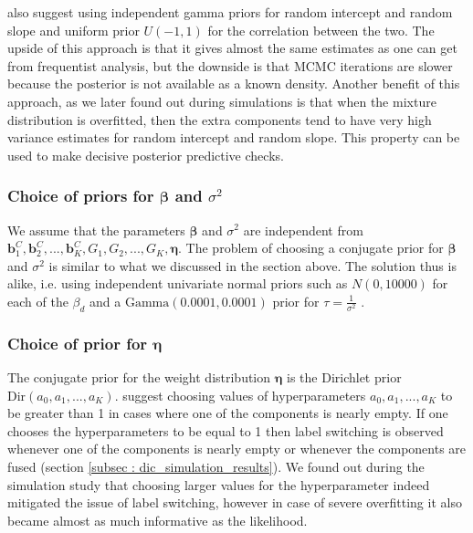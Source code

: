 \citet[pg. 260]{lesaffre_bayesian_2012} also suggest using independent gamma priors for random intercept and random slope and uniform prior $U(-1,1)$ for the correlation between the two. The upside of this approach is that it gives almost the same estimates as one can get from frequentist analysis, but the downside is that MCMC iterations are slower because the posterior is not available as a known density. Another benefit of this approach, as we later found out during simulations is that when the mixture distribution is overfitted, then the extra components tend to have very high variance estimates for random intercept and random slope. This property can be used to make decisive posterior predictive checks.

\subsubsection{Choice of priors for $\boldsymbol{\beta}$ and $\sigma^2$}
We assume that the parameters $\boldsymbol{\beta}$ and $\sigma^2$ are independent from $\boldsymbol{b}_1^C, \boldsymbol{b}_2^C, ..., \boldsymbol{b}_K^C, G_1, G_2, ..., G_K, \boldsymbol{\eta}$. The problem of choosing a conjugate prior for $\boldsymbol{\beta}$ and $\sigma^2$ is similar to what we discussed in the section above. The solution thus is alike, i.e. using independent univariate normal priors such as $N(0, 10000)$ for each of the $\beta_d$ and a $\text{Gamma}(0.0001, 0.0001)$ prior for $\tau = \frac 1 {\sigma^2}$ \citep[chap. 17]{gelman_data_2006}.

\subsubsection{Choice of prior for $\boldsymbol{\eta}$}
The conjugate prior for the weight distribution $\boldsymbol{\eta}$ is the Dirichlet prior $\text{Dir}(a_0, a_1,..., a_K)$. \citet[pg. 105]{fruhwirth-schnatter_finite_2013} suggest choosing values of hyperparameters $a_0, a_1,..., a_K$ to be greater than 1 in cases where one of the components is nearly empty. If one chooses the hyperparameters to be equal to 1 then label switching is observed whenever one of the components is nearly empty or whenever the components are fused (section \ref{subsec : dic_simulation_results}). We found out during the simulation study that choosing larger values for the hyperparameter indeed mitigated the issue of label switching, however in case of severe overfitting it also became almost as much informative as the likelihood.

